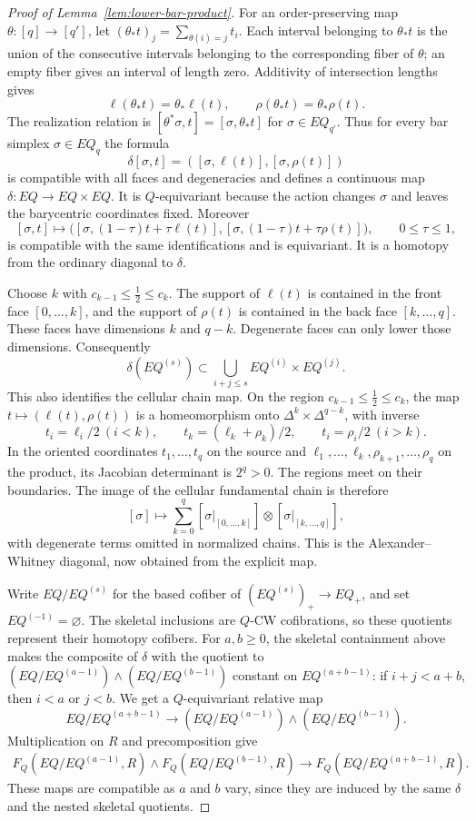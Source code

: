 \begin{proof}[Proof of Lemma~\ref{lem:lower-bar-product}]
For an order-preserving map $\theta:[q]\to[q']$, let
$(\theta_*t)_j=\sum_{\theta(i)=j}t_i$.  Each interval belonging to
$\theta_*t$ is the union of the consecutive intervals belonging to the
corresponding fiber of $\theta$; an empty fiber gives an interval of
length zero.  Additivity of intersection lengths gives
\[
 \ell(\theta_*t)=\theta_*\ell(t),\qquad
 \rho(\theta_*t)=\theta_*\rho(t).
\]
The realization relation is
$[\theta^*\sigma,t]=[\sigma,\theta_*t]$ for $\sigma\in EQ_{q'}$.
Thus for every bar simplex $\sigma\in EQ_q$ the formula
\[
 \delta[\sigma,t]=([\sigma,\ell(t)],[\sigma,\rho(t)])
\]
is compatible with all faces and degeneracies and defines a continuous
map $\delta:EQ\to EQ\times EQ$.  It is $Q$-equivariant because the
action changes $\sigma$ and leaves the barycentric coordinates fixed.
Moreover
\[
 [\sigma,t]\longmapsto
 \bigl([\sigma,(1-\tau)t+\tau\ell(t)],
       [\sigma,(1-\tau)t+\tau\rho(t)]\bigr),
 \qquad 0\leq\tau\leq1,
\]
is compatible with the same identifications and is equivariant.  It is
a homotopy from the ordinary diagonal to $\delta$.

Choose $k$ with $c_{k-1}\leq\tfrac12\leq c_k$.  The support of
$\ell(t)$ is contained in the front face $[0,\ldots,k]$, and the support
of $\rho(t)$ is contained in the back face $[k,\ldots,q]$.  These faces
have dimensions $k$ and $q-k$.  Degenerate faces can only lower those
dimensions.  Consequently
\[
 \delta(EQ^{(s)})\subset
 \bigcup_{i+j\leq s}EQ^{(i)}\times EQ^{(j)}.
\]
This also identifies the cellular chain map.  On the region
$c_{k-1}\leq\tfrac12\leq c_k$, the map
$t\mapsto(\ell(t),\rho(t))$ is a homeomorphism onto
$\Delta^k\times\Delta^{q-k}$, with inverse
\[
 t_i=\ell_i/2\ (i<k),\qquad
 t_k=(\ell_k+\rho_k)/2,\qquad
 t_i=\rho_i/2\ (i>k).
\]
In the oriented coordinates $t_1,\ldots,t_q$ on the source and
$\ell_1,\ldots,\ell_k,\rho_{k+1},\ldots,\rho_q$ on the product, its
Jacobian determinant is $2^q>0$.  The regions meet on their boundaries.
The image of the cellular fundamental chain is therefore
\[
 [\sigma]\longmapsto
 \sum_{k=0}^q
 [\sigma|_{[0,\ldots,k]}]\otimes
 [\sigma|_{[k,\ldots,q]}],
\]
with degenerate terms omitted in normalized chains.  This is the
Alexander--Whitney diagonal, now obtained from the explicit map.

Write $EQ/EQ^{(s)}$ for the based cofiber of
$(EQ^{(s)})_+\to EQ_+$, and set $EQ^{(-1)}=\varnothing$.
The skeletal inclusions are $Q$-CW cofibrations, so these quotients
represent their homotopy cofibers.  For $a,b\geq0$, the skeletal
containment above makes the composite of $\delta$ with the quotient to
$(EQ/EQ^{(a-1)})\wedge(EQ/EQ^{(b-1)})$ constant on
$EQ^{(a+b-1)}$: if $i+j<a+b$, then $i<a$ or $j<b$.  We get a
$Q$-equivariant relative map
\[
 EQ/EQ^{(a+b-1)}\longrightarrow
 (EQ/EQ^{(a-1)})\wedge(EQ/EQ^{(b-1)}).
\]
Multiplication on $R$ and precomposition give
\[
 \begin{split}
 F_Q(EQ/EQ^{(a-1)},R)\wedge F_Q(EQ/EQ^{(b-1)},R)
 \longrightarrow F_Q(EQ/EQ^{(a+b-1)},R).
 \end{split}
\]
These maps are compatible as $a$ and $b$ vary, since they are induced
by the same $\delta$ and the nested skeletal quotients.


\end{proof}
